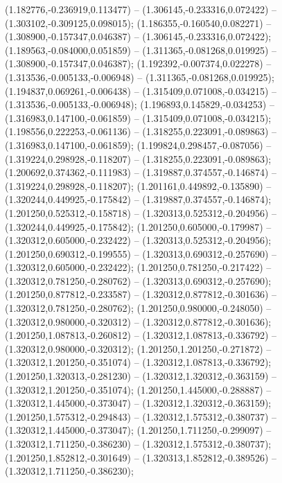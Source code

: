  (1.182776,-0.236919,0.113477) -- (1.306145,-0.233316,0.072422) -- (1.303102,-0.309125,0.098015);
 (1.186355,-0.160540,0.082271) -- (1.308900,-0.157347,0.046387) -- (1.306145,-0.233316,0.072422);
 (1.189563,-0.084000,0.051859) -- (1.311365,-0.081268,0.019925) -- (1.308900,-0.157347,0.046387);
 (1.192392,-0.007374,0.022278) -- (1.313536,-0.005133,-0.006948) -- (1.311365,-0.081268,0.019925);
 (1.194837,0.069261,-0.006438) -- (1.315409,0.071008,-0.034215) -- (1.313536,-0.005133,-0.006948);
 (1.196893,0.145829,-0.034253) -- (1.316983,0.147100,-0.061859) -- (1.315409,0.071008,-0.034215);
 (1.198556,0.222253,-0.061136) -- (1.318255,0.223091,-0.089863) -- (1.316983,0.147100,-0.061859);
 (1.199824,0.298457,-0.087056) -- (1.319224,0.298928,-0.118207) -- (1.318255,0.223091,-0.089863);
 (1.200692,0.374362,-0.111983) -- (1.319887,0.374557,-0.146874) -- (1.319224,0.298928,-0.118207);
 (1.201161,0.449892,-0.135890) -- (1.320244,0.449925,-0.175842) -- (1.319887,0.374557,-0.146874);
 (1.201250,0.525312,-0.158718) -- (1.320313,0.525312,-0.204956) -- (1.320244,0.449925,-0.175842);
 (1.201250,0.605000,-0.179987) -- (1.320312,0.605000,-0.232422) -- (1.320313,0.525312,-0.204956);
 (1.201250,0.690312,-0.199555) -- (1.320313,0.690312,-0.257690) -- (1.320312,0.605000,-0.232422);
 (1.201250,0.781250,-0.217422) -- (1.320312,0.781250,-0.280762) -- (1.320313,0.690312,-0.257690);
 (1.201250,0.877812,-0.233587) -- (1.320312,0.877812,-0.301636) -- (1.320312,0.781250,-0.280762);
 (1.201250,0.980000,-0.248050) -- (1.320312,0.980000,-0.320312) -- (1.320312,0.877812,-0.301636);
 (1.201250,1.087813,-0.260812) -- (1.320312,1.087813,-0.336792) -- (1.320312,0.980000,-0.320312);
 (1.201250,1.201250,-0.271872) -- (1.320312,1.201250,-0.351074) -- (1.320312,1.087813,-0.336792);
 (1.201250,1.320313,-0.281230) -- (1.320312,1.320312,-0.363159) -- (1.320312,1.201250,-0.351074);
 (1.201250,1.445000,-0.288887) -- (1.320312,1.445000,-0.373047) -- (1.320312,1.320312,-0.363159);
 (1.201250,1.575312,-0.294843) -- (1.320312,1.575312,-0.380737) -- (1.320312,1.445000,-0.373047);
 (1.201250,1.711250,-0.299097) -- (1.320312,1.711250,-0.386230) -- (1.320312,1.575312,-0.380737);
 (1.201250,1.852812,-0.301649) -- (1.320313,1.852812,-0.389526) -- (1.320312,1.711250,-0.386230);
